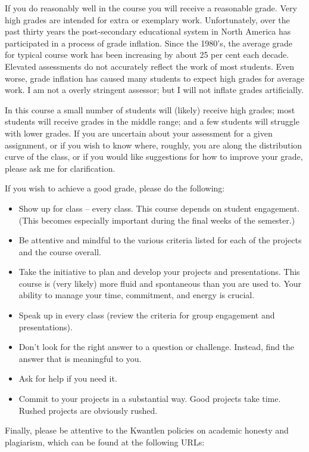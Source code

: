 \documentclass[letterpaper,10pt,headsepline]{scrreprt}
\begin{document}
If you do reasonably well in the course you will receive a reasonable grade. Very high grades are intended for extra or exemplary work. Unfortunately, over the past thirty years the post-secondary educational system in North America has participated in a process of grade inflation. Since the 1980's, the average grade for typical course work has been increasing by about 25 per cent each decade.
Elevated assessments do not accurately reflect the work of most students. Even worse, grade inflation has caused many students to expect high grades for average work. I am not a overly stringent assessor; but I will not inflate grades artificially.

In this course a small number of students will (likely) receive high grades; most students will receive grades in the middle range; and a few students will struggle with lower grades. If you are uncertain about your assessment for a given assignment, or if you wish to know where, roughly, you are along the distribution curve of the class, or if you would like suggestions for how to improve your grade, please ask me for clarification.

If you wish to achieve a good grade, please do the following:

\begin{itemize}
\item Show up for class -- every class. This course depends on student engagement. (This becomes especially important during the final weeks of the semester.)
\item Be attentive and mindful to the various criteria listed for each of the projects and the course overall.
\item Take the initiative to plan and develop your projects and presentations. This course is (very likely) more fluid and spontaneous than you are used to. Your ability to manage your time, commitment, and energy is crucial.
\item Speak up in every class (review the criteria for group engagement and presentations).
\item Don't look for the right answer to a question or challenge. Instead, find the answer that is meaningful to you.
\item Ask for help if you need it.
\item Commit to your projects in a substantial way. Good projects take time. Rushed projects are obviously rushed.
\end{itemize}

Finally, please be attentive to the Kwantlen policies on academic honesty and plagiarism, which can be found at the following URLs:
\end{document}

